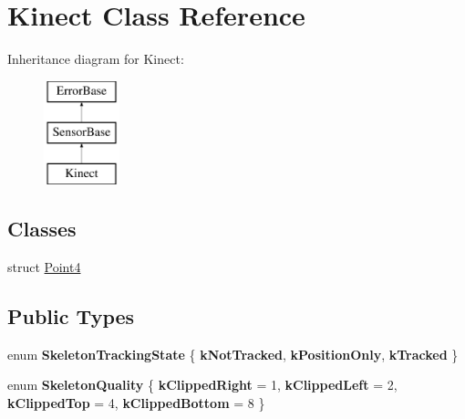 \hypertarget{classKinect}{
\section{Kinect Class Reference}
\label{classKinect}
}
Inheritance diagram for Kinect:\begin{figure}[H]
\begin{center}
\leavevmode
\includegraphics[height=3.000000cm]{classKinect}
\end{center}
\end{figure}
\subsection*{Classes}
\begin{DoxyCompactItemize}
\item 
struct \hyperlink{structKinect_1_1Point4}{Point4}
\end{DoxyCompactItemize}
\subsection*{Public Types}
\begin{DoxyCompactItemize}
\item 
enum {\bfseries SkeletonTrackingState} \{ {\bfseries kNotTracked}, 
{\bfseries kPositionOnly}, 
{\bfseries kTracked}
 \}
\item 
enum {\bfseries SkeletonQuality} \{ {\bfseries kClippedRight} =  1, 
{\bfseries kClippedLeft} =  2, 
{\bfseries kClippedTop} =  4, 
{\bfseries kClippedBottom} =  8
 \}
\end{DoxyCompactItemize}
